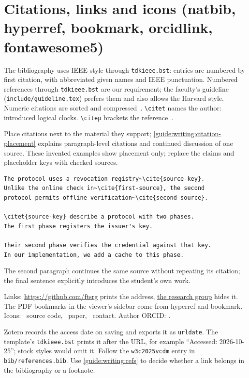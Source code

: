 \section{Citations, links and icons (natbib, hyperref, bookmark, orcidlink, fontawesome5)}\label{guide:latex:cite}
The bibliography uses IEEE style through \texttt{tdkieee.bst}: entries are numbered by first citation, with abbreviated given names and IEEE punctuation. Numbered references through \texttt{tdkieee.bst} are our requirement; the faculty's guideline (\texttt{include/guideline.tex}) prefers them and also allows the Harvard style. Numeric citations are sorted and compressed~\cite{guide:w3c2025vcdm,guide:lamport1978time}.
\texttt{\textbackslash citet} names the author: \citet{guide:lamport1978time} introduced logical clocks.
\texttt{\textbackslash citep} brackets the reference~\citep{guide:lamport1978time}.

Place citations next to the material they support; \cref{guide:writing:citation-placement} explains paragraph-level citations and continued discussion of one source. These invented examples show placement only; replace the claims and placeholder keys with checked sources.
\begin{verbatim}
The protocol uses a revocation registry~\cite{source-key}.
Unlike the online check in~\cite{first-source}, the second
protocol permits offline verification~\cite{second-source}.

\citet{source-key} describe a protocol with two phases.
The first phase registers the issuer's key.

Their second phase verifies the credential against that key.
In our implementation, we add a cache to this phase.
\end{verbatim}
The second paragraph continues the same source without repeating its citation; the final sentence explicitly introduces the student's own work.

Links: \url{https://github.com/ftsrg} prints the address, \href{https://ftsrg.mit.bme.hu}{the research group} hides it.
The PDF bookmarks in the viewer's sidebar come from hyperref and bookmark.
Icons: \faGithub~source code, \faFilePdf~paper, \faEnvelope~contact. Author ORCID: .

Zotero records the access date on saving and exports it as \texttt{urldate}. The template's \texttt{tdkieee.bst} prints it after the URL, for example \enquote{Accessed: 2026-10-25}; stock styles would omit it. Follow the \texttt{w3c2025vcdm} entry in \texttt{bib/references.bib}. Use \cref{guide:writing:refs} to decide whether a link belongs in the bibliography or a footnote.

